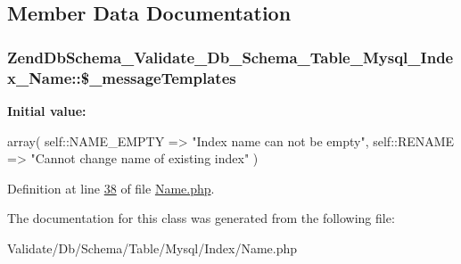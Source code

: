 \subsection{\-Member \-Data \-Documentation}
\hypertarget{classZendDbSchema__Validate__Db__Schema__Table__Mysql__Index__Name_a73bc325ece4223b26e033f526c939a4a}{
\subsubsection[{\$\-\_\-message\-Templates}]{\setlength{\rightskip}{0pt plus 5cm}\-Zend\-Db\-Schema\-\_\-\-Validate\-\_\-\-Db\-\_\-\-Schema\-\_\-\-Table\-\_\-\-Mysql\-\_\-\-Index\-\_\-\-Name\-::\$\-\_\-message\-Templates}}\label{classZendDbSchema__Validate__Db__Schema__Table__Mysql__Index__Name_a73bc325ece4223b26e033f526c939a4a}
{\bfseries \-Initial value\-:}
\begin{DoxyCode}
 array(
        self::NAME\_EMPTY      => \textcolor{stringliteral}{"Index name can not be empty"},
        self::RENAME          => \textcolor{stringliteral}{"Cannot change name of existing index"}
    )
\end{DoxyCode}


\-Definition at line \hyperlink{Table_2Mysql_2Index_2Name_8php_source_l00038}{38} of file \hyperlink{Table_2Mysql_2Index_2Name_8php_source}{\-Name.\-php}.



\-The documentation for this class was generated from the following file\-:\begin{DoxyCompactItemize}
\item 
\-Validate/\-Db/\-Schema/\-Table/\-Mysql/\-Index/\-Name.\-php\end{DoxyCompactItemize}
